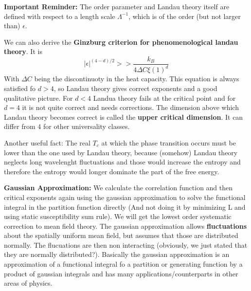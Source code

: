 	\textbf{Important Reminder:} The order parameter and Landau theory itself are defined with respect to a length scale $\Lambda^{-1}$, which is of the order (but not larger than) $\epsilon$.
	
	
	
	We can also derive the \textbf{Ginzburg criterion for phenomenological landau theory}. It is
	\begin{equation}
		|\epsilon|^{(4-d)/2} >> \frac{k_B}{4 \Delta C \xi(1)^d}
	\end{equation}
	With $\Delta C$ being the discontinuoty in the heat capacity.
	This equation is always satisfied fo $d > 4$, so Landau theory gives correct exponents and a good qualitative picture. For $d < 4$ Landua theory fails at the critical point and for $d=4$ it is not quite correct and needs corrections. The dimension above which Landau theory becomes correct is called the \textbf{upper critical dimension}. It can differ from 4 for other universality classes.
	
	Another useful fact: The real $T_c$ at which the phase transition occurs must be lower than the one used by Landau theory, because (somehow) Landau theory neglects long wavelenght fluctuations and those would increase the entropy and therefore the entropy would longer dominate the part of the free energy.
	
	\textbf{Gaussian Approximation:} We calculate the correlation function and then critical exponents again using the gaussian approximation to solve the functional integral in the partition function directly (And not doing it by minimizing L	and using static susceptibility sum rule). We will get the lowest order systematic correction to mean field theory. The gaussian approximation allows \textbf{fluctuations} about the spatially uniform mean field, but assumes that those are distributed normally. The flucuations are then non interacting (obviously, we just stated that they are normally distributed?). Basically the gaussian approximation is an approximation of a functional integral fo a partition or generating function by a product of gaussian integrals and has many applications/counterparts in other areas of physics.
	
